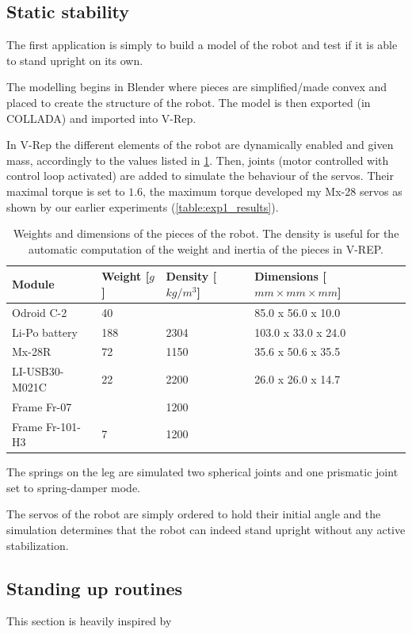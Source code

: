 \subsection{Static stability}
The first application is simply to build a model of the robot and test if it is able to stand upright on its own.

The modelling begins in Blender where pieces are simplified/made convex and placed to create the structure of the robot. The model is then exported (in COLLADA) and imported into V-Rep. 

In V-Rep the different elements of the robot are dynamically enabled and given mass, accordingly to the values listed in \cref{table:weights}. Then, joints (motor controlled with control loop activated) are added to simulate the behaviour of the servos. Their maximal torque is set to $1.6$, the maximum torque developed my Mx-28 servos as shown by our earlier experiments (\cref{table:exp1_results}). 

\begin{table}[htp]
\center
\begin{tabularx}{\textwidth}{@{} X X X l @{}}
\toprule
\textbf{Module} & \textbf{Weight [$g$]} &  \textbf{Density [$kg/m^3$]}& \textbf{Dimensions [$mm \times mm \times mm$]}\\ 
\midrule
Odroid C-2 & 40 &  & 85.0 x 56.0 x 10.0\\
Li-Po battery & 188 & 2304 & 103.0 x 33.0 x 24.0\\
Mx-28R & 72 & 1150 & 35.6 x 50.6 x 35.5\\
LI-USB30-M021C & 22 & 2200 & 26.0 x 26.0 x 14.7\\
Frame Fr-07 & & 1200 & \\
Frame Fr-101-H3 & 7 & 1200 & \\
\bottomrule
\end{tabularx}
\caption[Weights and dimensions of the pieces of the robot]{Weights and dimensions of the pieces of the robot. The density is useful for the automatic computation of the weight and inertia of the pieces in V-REP.}
\label{table:weights}
\end{table}

The springs on the leg are simulated two spherical joints and one prismatic joint set to spring-damper mode.

The servos of the robot are simply ordered to hold their initial angle and the simulation determines that the robot can indeed stand upright without any active stabilization.

\subsection{Standing up routines}
This section is heavily inspired by \cite{Stuckler06}

